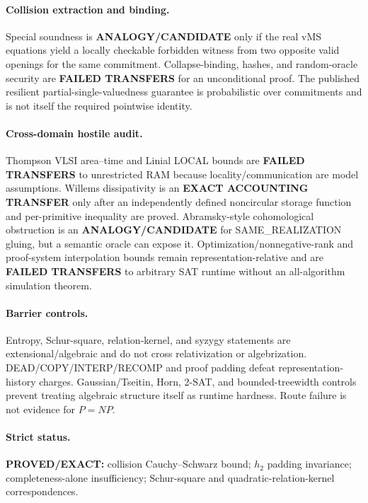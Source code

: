 \documentclass[11pt]{article}
\begin{document}
\paragraph{Collision extraction and binding.}
Special soundness is \textbf{ANALOGY/CANDIDATE} only if the real vMS equations yield a locally checkable forbidden witness from two opposite valid openings for the same commitment. Collapse-binding, hashes, and random-oracle security are \textbf{FAILED TRANSFERS} for an unconditional proof. The published resilient partial-single-valuedness guarantee is probabilistic over commitments and is not itself the required pointwise identity.

\paragraph{Cross-domain hostile audit.}
Thompson VLSI area--time and Linial LOCAL bounds are \textbf{FAILED TRANSFERS} to unrestricted RAM because locality/communication are model assumptions. Willems dissipativity is an \textbf{EXACT ACCOUNTING TRANSFER} only after an independently defined noncircular storage function and per-primitive inequality are proved. Abramsky-style cohomological obstruction is an \textbf{ANALOGY/CANDIDATE} for SAME_REALIZATION gluing, but a semantic oracle can expose it. Optimization/nonnegative-rank and proof-system interpolation bounds remain representation-relative and are \textbf{FAILED TRANSFERS} to arbitrary SAT runtime without an all-algorithm simulation theorem.

\paragraph{Barrier controls.}
Entropy, Schur-square, relation-kernel, and syzygy statements are extensional/algebraic and do not cross relativization or algebrization. DEAD/COPY/INTERP/RECOMP and proof padding defeat representation-history charges. Gaussian/Tseitin, Horn, 2-SAT, and bounded-treewidth controls prevent treating algebraic structure itself as runtime hardness. Route failure is not evidence for $P=NP$.

\paragraph{Strict status.}
\textbf{PROVED/EXACT:} collision Cauchy--Schwarz bound; $h_2$ padding invariance; completeness-alone insufficiency; Schur-square and quadratic-relation-kernel correspondences.
\end{document}
